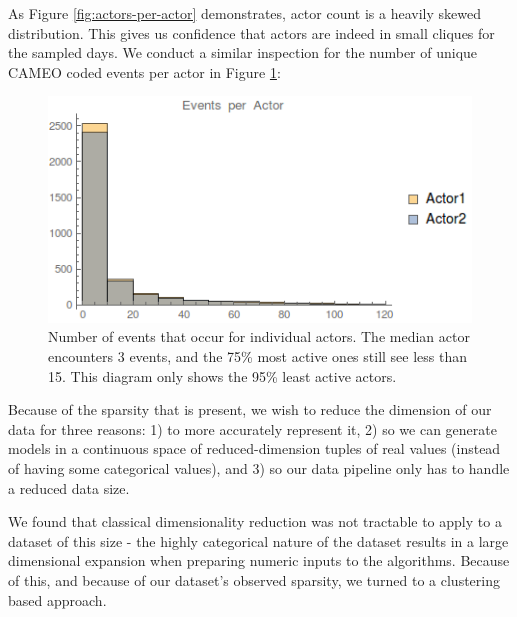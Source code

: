 As Figure \ref{fig:actors-per-actor} demonstrates, actor count is a heavily skewed distribution. This gives us confidence that actors are indeed in small cliques for the sampled days. We conduct a similar inspection for the number of unique CAMEO coded events per actor in Figure \ref{fig:events-per-actor}:

\begin{figure}[ht]
\vskip 0.2in
\begin{center}
\centerline{\includegraphics[width=\columnwidth]{images/events-per-actor}}
\caption{Number of events that occur for individual actors. The median actor encounters 3 events, and the 75\% most active ones still see less than 15. This diagram only shows the 95\% least active actors.}
\end{center}
\vskip -0.2in
\label{fig:events-per-actor}
\end{figure} 

Because of the sparsity that is present, we wish to reduce the dimension of our data for three reasons: 1) to more accurately represent it, 2) so we can generate models in a continuous space of reduced-dimension tuples of real values (instead of having some categorical values), and 3) so our data pipeline only has to handle a reduced data size.

We found that classical dimensionality reduction was not tractable to apply to a dataset of this size - the highly categorical nature of the dataset results in a large dimensional expansion when preparing numeric inputs to the algorithms. Because of this, and because of our dataset's observed sparsity, we turned to a clustering based approach. 

